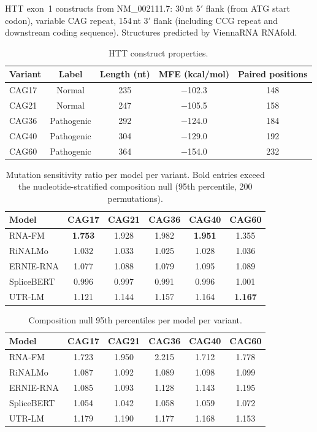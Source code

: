 \documentclass[11pt]{article}
\begin{document}
HTT exon~1 constructs from NM\_002111.7: 30\,nt 5$'$ flank
(from ATG start codon), variable CAG repeat, 154\,nt 3$'$ flank
(including CCG repeat and downstream coding sequence).  Structures
predicted by ViennaRNA RNAfold.

\begin{table}[h]
\centering
\small
\caption{HTT construct properties.}
\begin{tabular}{@{}lcccc@{}}
\toprule
\textbf{Variant} & \textbf{Label} & \textbf{Length (nt)} &
  \textbf{MFE (kcal/mol)} & \textbf{Paired positions} \\
\midrule
CAG17 & Normal       & 235 & $-$102.3 & 148 \\
CAG21 & Normal       & 247 & $-$105.5 & 158 \\
CAG36 & Pathogenic   & 292 & $-$124.0 & 184 \\
CAG40 & Pathogenic   & 304 & $-$129.0 & 192 \\
CAG60 & Pathogenic   & 364 & $-$154.0 & 232 \\
\bottomrule
\end{tabular}
\end{table}

\begin{table}[h]
\centering
\small
\caption{Mutation sensitivity ratio per model per variant.
  Bold entries exceed the nucleotide-stratified composition null
  (95th percentile, 200 permutations).}
\begin{tabular}{@{}lccccc@{}}
\toprule
\textbf{Model} & \textbf{CAG17} & \textbf{CAG21} &
  \textbf{CAG36} & \textbf{CAG40} & \textbf{CAG60} \\
\midrule
RNA-FM     & \textbf{1.753} & 1.928 & 1.982 & \textbf{1.951} & 1.355 \\
RiNALMo    & 1.032 & 1.033 & 1.025 & 1.028 & 1.036 \\
ERNIE-RNA  & 1.077 & 1.088 & 1.079 & 1.095 & 1.089 \\
SpliceBERT & 0.996 & 0.997 & 0.991 & 0.996 & 1.001 \\
UTR-LM     & 1.121 & 1.144 & 1.157 & 1.164 & \textbf{1.167} \\
\bottomrule
\end{tabular}
\end{table}

\begin{table}[h]
\centering
\small
\caption{Composition null 95th percentiles per model per variant.}
\begin{tabular}{@{}lccccc@{}}
\toprule
\textbf{Model} & \textbf{CAG17} & \textbf{CAG21} &
  \textbf{CAG36} & \textbf{CAG40} & \textbf{CAG60} \\
\midrule
RNA-FM     & 1.723 & 1.950 & 2.215 & 1.712 & 1.778 \\
RiNALMo    & 1.087 & 1.092 & 1.089 & 1.098 & 1.099 \\
ERNIE-RNA  & 1.085 & 1.093 & 1.128 & 1.143 & 1.195 \\
SpliceBERT & 1.054 & 1.042 & 1.058 & 1.059 & 1.072 \\
UTR-LM     & 1.179 & 1.190 & 1.177 & 1.168 & 1.153 \\
\bottomrule
\end{tabular}
\end{table}
\end{document}
